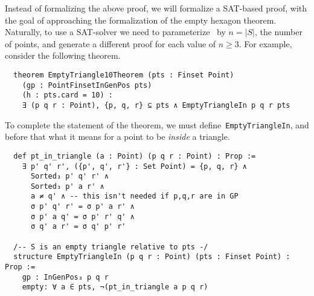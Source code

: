 Instead of formalizing the above proof, we will formalize a SAT-based proof, with the goal of approaching the formalization of the empty hexagon theorem.
Naturally, to use a  SAT-solver we need to parameterize~ by $n = |S|$, the number of points, and generate a different proof for each value of $n \geq 3$. For example, consider the following theorem.

\begin{lstlisting}
  theorem EmptyTriangle10Theorem (pts : Finset Point)
    (gp : PointFinsetInGenPos pts)
    (h : pts.card = 10) :
    ∃ (p q r : Point), {p, q, r} ⊆ pts ∧ EmptyTriangleIn p q r pts
\end{lstlisting}

To complete the statement of the theorem, we must define~\texttt{EmptyTriangleIn}, and before that what it means for a point to be \emph{inside} a triangle.

\begin{lstlisting}
  def pt_in_triangle (a : Point) (p q r : Point) : Prop :=
    ∃ p' q' r', ({p', q', r'} : Set Point) = {p, q, r} ∧
      Sorted₃ p' q' r' ∧
      Sorted₃ p' a r' ∧
      a ≠ q' ∧ -- this isn't needed if p,q,r are in GP
      σ p' q' r' = σ p' a r' ∧
      σ p' a q' = σ p' r' q' ∧
      σ q' a r' = σ q' p' r'

  /-- S is an empty triangle relative to pts -/
  structure EmptyTriangleIn (p q r : Point) (pts : Finset Point) : Prop :=
    gp : InGenPos₃ p q r
    empty: ∀ a ∈ pts, ¬(pt_in_triangle a p q r)
\end{lstlisting}


